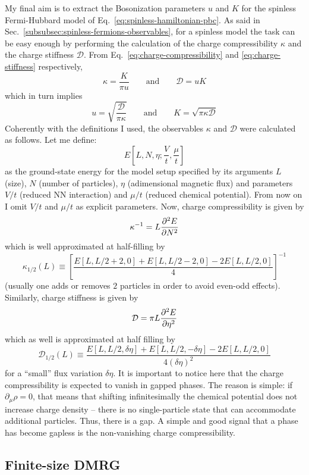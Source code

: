 My final aim is to extract the Bosonization parameters $u$ and $K$ for the spinless Fermi-Hubbard model of Eq.~\eqref{eq:spinless-hamiltonian-pbc}. As said in Sec.~\ref{subsubsec:spinless-fermions-observables}, for a spinless model the task can be easy enough by performing the calculation of the charge compressibility $\kappa$ and the charge stiffness $\mathcal{D}$. From Eq.~\eqref{eq:charge-compressibility} and \eqref{eq:charge-stiffness} respectively,
\begin{equation}\label{eq:charge-compressibility-stiffness-definitions}
	\kappa = \frac{K}{\pi u}
	\qquad\text{and}\qquad
	\mathcal{D} = uK
\end{equation}
which in turn implies
\begin{equation}\label{eq:u-K-formulas}
	u = \sqrt{\frac{\mathcal{D}}{\pi\kappa}}
	\qquad\text{and}\qquad
	K = \sqrt{\pi\kappa\mathcal{D}}
\end{equation}
Coherently with the definitions I used, the observables $\kappa$ and $\mathcal{D}$ were calculated as follows. Let me define:
\[
	E\left[
		L,N,\eta;\frac{V}{t},\frac{\mu}{t}
	\right]
\]
as the ground-state energy for the model setup specified by its arguments $L$ (size), $N$ (number of particles), $\eta$ (adimensional magnetic flux) and parameters $V/t$ (reduced NN interaction) and $\mu/t$ (reduced chemical potential). From now on I omit $V/t$ and $\mu/t$ as explicit parameters. Now, charge compressibility is given by
\[
	\kappa^{-1} = L \pdv[2]{E}{N}
\]
which is well approximated at half-filling by
\begin{equation}\label{eq:charge-compressibility-approximation}
	\kappa_{1/2}(L) \equiv \left[
		\frac{E[L,L/2+2,0]+E[L,L/2-2,0]-2E[L,L/2,0]}{4}
	\right]^{-1}
\end{equation}
(usually one adds or removes $2$ particles in order to avoid even-odd effects). Similarly, charge stiffness is given by
\[
	\mathcal{D} = \pi L \pdv[2]{E}{\eta}
\]
which as well is approximated at half filling by
\begin{equation}\label{eq:charge-stiffness-approximation}
	\mathcal{D}_{1/2}(L) \equiv
	\frac{E[L,L/2,\delta\eta]+E[L,L/2,-\delta\eta]-2E[L,L/2,0]}{4(\delta\eta)^2}
\end{equation}
for a ``small'' flux variation $\delta\eta$. It is important to notice here that the charge compressibility is expected to vanish in gapped phases. The reason is simple: if $\partial_\mu \rho=0$, that means that shifting infinitesimally the chemical potential does not increase charge density -- there is no single-particle state that can accommodate additional particles. Thus, there is a gap. A simple and good signal that a phase has become gapless is the non-vanishing charge compressibility.

\subsection{Finite-size DMRG}

\todo
